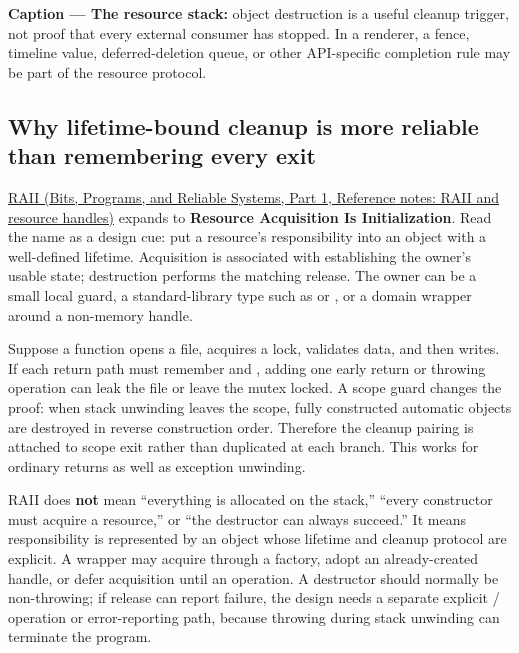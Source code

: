 
\textbf{Caption --- The resource stack:} object destruction is a useful cleanup trigger, not proof that every external consumer has stopped. In a renderer, a fence, timeline value, deferred-deletion queue, or other API-specific completion rule may be part of the resource protocol.

\subsection{Why lifetime-bound cleanup is more reliable than remembering every exit}\label{01-foundations-i-ch004-why-lifetime-bound-cleanup-is-more-reliable-than-remembering-every-exit}

\hypertarget{01-foundations-i-ch004-why-lifetime-bound-cleanup-is-more-reliable-than-remembering-every-exit}{}

\href{../01-Bits-Programs-and-Reliable-Systems-P01/main.pdf\#nameddest=appendix-69739d3ab49b}{RAII (Bits, Programs, and Reliable Systems, Part 1, Reference notes: RAII and resource handles)} expands to \textbf{Resource Acquisition Is Initialization}. Read the name as a design cue: put a resource's responsibility into an object with a well-defined lifetime. Acquisition is associated with establishing the owner's usable state; destruction performs the matching release. The owner can be a small local guard, a standard-library type such as  or , or a domain wrapper around a non-memory handle.

Suppose a function opens a file, acquires a lock, validates data, and then writes. If each return path must remember  and , adding one early return or throwing operation can leak the file or leave the mutex locked. A scope guard changes the proof: when stack unwinding leaves the scope, fully constructed automatic objects are destroyed in reverse construction order. Therefore the cleanup pairing is attached to scope exit rather than duplicated at each branch. This works for ordinary returns as well as exception unwinding.

RAII does \textbf{not} mean ``everything is allocated on the stack,'' ``every constructor must acquire a resource,'' or ``the destructor can always succeed.'' It means responsibility is represented by an object whose lifetime and cleanup protocol are explicit. A wrapper may acquire through a factory, adopt an already-created handle, or defer acquisition until an operation. A destructor should normally be non-throwing; if release can report failure, the design needs a separate explicit / operation or error-reporting path, because throwing during stack unwinding can terminate the program.

